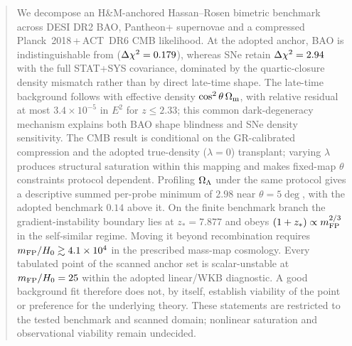 \begin{abstract}
\noindent
We decompose an H\&M-anchored Hassan--Rosen bimetric benchmark across DESI DR2 BAO, Pantheon+ supernovae and a compressed Planck~2018\,+\,ACT~DR6 CMB likelihood. At the adopted anchor, BAO is indistinguishable from \LCDM{} ($\Dchi=0.179$), whereas SNe retain $\Dchi=2.94$ with the full STAT+SYS covariance, dominated by the quartic-closure density mismatch rather than by direct late-time shape. The late-time background follows \LCDM{} with effective density $\cos^2\theta\,\Om$, with relative residual at most $3.4\times10^{-5}$ in $E^2$ for $z\le2.33$; this common dark-degeneracy mechanism explains both BAO shape blindness and SNe density sensitivity. The CMB result is conditional on the GR-calibrated compression and the adopted true-density ($\lambda=0$) transplant; varying $\lambda$ produces structural saturation within this mapping and makes fixed-map $\theta$ constraints protocol dependent. Profiling $\OL$ under the same protocol gives a descriptive summed per-probe minimum of $2.98$ near $\theta=5\deg$, with the adopted benchmark $0.14$ above it. On the finite benchmark branch the gradient-instability boundary lies at $z_*=7.877$ and obeys $(1+z_*)\propto\mFP^{2/3}$ in the self-similar regime. Moving it beyond recombination requires $\mFP/H_0\gtrsim4.1\times10^4$ in the prescribed mass-map cosmology. Every tabulated point of the scanned anchor set is scalar-unstable at $\mFP/H_0=25$ within the adopted linear/WKB diagnostic. A good background fit therefore does not, by itself, establish viability of the point or preference for the underlying theory. These statements are restricted to the tested benchmark and scanned domain; nonlinear saturation and observational viability remain undecided.
\end{abstract}
\medskip
